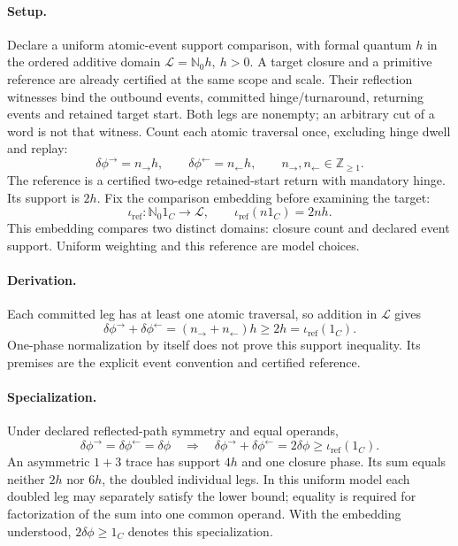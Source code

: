 \paragraph{Setup.}
Declare a uniform atomic-event support comparison, with formal quantum
\(h\) in the ordered additive domain \(\mathcal L=\mathbb N_0 h,\ h>0\).
A target closure and a primitive reference are already certified at the same
scope and scale. Their reflection witnesses bind the outbound events, committed
hinge/turnaround, returning events and retained target start. Both legs are
nonempty; an arbitrary cut of a word is not that witness. Count each atomic
traversal once, excluding hinge dwell and replay:
\begin{equation}
\delta\phi^{\rightarrow}=n_{\rightarrow}h,\qquad
\delta\phi^{\leftarrow}=n_{\leftarrow}h,\qquad
n_{\rightarrow},n_{\leftarrow}\in\mathbb Z_{\ge1}.
\label{eq:directed-leg-operands}
\end{equation}
The reference is a certified two-edge retained-start return with mandatory
hinge. Its support is \(2h\). Fix the comparison embedding before examining
the target:
\begin{equation}
\iota_{\mathrm{ref}}:\mathbb N_0 1_C\longrightarrow\mathcal L,
\qquad \iota_{\mathrm{ref}}(n1_C)=2nh.
\label{eq:phase-unit-embedding}
\end{equation}
This embedding compares two distinct domains: closure count and declared
event support. Uniform weighting and this reference are model choices.

\paragraph{Derivation.}
Each committed leg has at least one atomic traversal, so addition in
\(\mathcal L\) gives
\begin{equation}
\delta\phi^{\rightarrow}+\delta\phi^{\leftarrow}
=(n_{\rightarrow}+n_{\leftarrow})h
\ge2h=\iota_{\mathrm{ref}}(1_C).
\label{eq:reflected-leg-bound}
\end{equation}
One-phase normalization by itself does not prove this support inequality.
Its premises are the explicit event convention and certified reference.

\paragraph{Specialization.}
Under declared reflected-path symmetry and equal operands,
\begin{equation}
\delta\phi^{\rightarrow}=\delta\phi^{\leftarrow}=\delta\phi
\quad\Longrightarrow\quad
\delta\phi^{\rightarrow}+\delta\phi^{\leftarrow}=2\delta\phi
\ge\iota_{\mathrm{ref}}(1_C).
\label{eq:equal-leg-factorization}
\end{equation}
An asymmetric \(1+3\) trace has support \(4h\) and one closure phase. Its sum
equals neither \(2h\) nor \(6h\), the doubled individual legs. In this uniform
model each doubled leg may separately satisfy the lower bound; equality is
required for factorization of the sum into one common operand. With the
embedding understood, \(2\delta\phi\ge1_C\) denotes this specialization.

